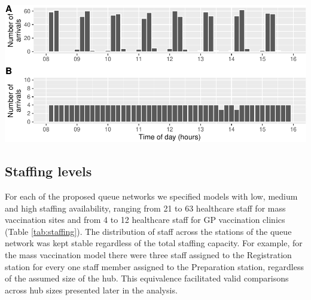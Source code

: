 \documentclass{article}
\let\origfigure\figure
\let\endorigfigure\endfigure
\renewenvironment{figure}[1][2] {
    \expandafter\origfigure\expandafter[H]
} {
    \endorigfigure
}
\begin{document}
\begin{figure}

{\centering \includegraphics{Preprint_files/figure-latex/arrivalTimes-1} 

}

\caption{Randomly generated arrival times for a mass vaccination hub (A) and a GP vaccination clinic (B)}\label{fig:arrivalTimes}
\end{figure}

\hypertarget{staffing-levels}{%
\subsection{Staffing levels}\label{staffing-levels}}

For each of the proposed queue networks we specified models with low,
medium and high staffing availability, ranging from 21 to 63 healthcare
staff for mass vaccination sites and from 4 to 12 healthcare staff for
GP vaccination clinics (Table \ref{tab:staffing}). The distribution of
staff across the stations of the queue network was kept stable
regardless of the total staffing capacity. For example, for the mass
vaccination model there were three staff assigned to the Registration
station for every one staff member assigned to the Preparation station,
regardless of the assumed size of the hub. This equivalence facilitated
valid comparisons across hub sizes presented later in the analysis.
\end{document}
